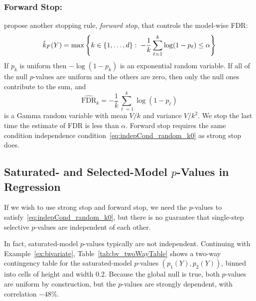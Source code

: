 \documentclass{article}
\begin{document}
\subsubsection{Forward Stop:}

\citet{gsell2013sequential} propose another stopping rule, {\em forward stop}, that controls the model-wise FDR:
\[
  \hat{k}_{F}(Y) = \max\left\{k \in \{1,\ldots,d\} :\;
    -\frac{1}{k}\sum_{\ell=1}^k \log(1-p_\ell) \leq \alpha\right\}
\]
If $p_k$ is uniform then  $-\log(1-p_k)$ is an exponential random variable. If all of the null $p$-values are uniform and the others are zero, then only the null ones contribute to the sum, and
\[
\widehat{\text{FDR}}_k = -\frac{1}{k}\sum_{\ell=1}^k \log(1-p_\ell)
\]
is a Gamma random variable with mean $V/k$ and variance $V/k^2$. We stop the last time the estimate of FDR is less than $\alpha$. Forward stop requires the same condition independence condition~\eqref{eq:indepCond_random_k0} as strong stop does.

\subsection{Saturated- and Selected-Model $p$-Values in Regression}

If we wish to use strong stop and forward stop, we need the $p$-values to satisfy~\eqref{eq:indepCond_random_k0}, but there is no guarantee that single-step selective $p$-values are independent of each other.

In fact, saturated-model $p$-values typically are not independent. Continuing with Example~\ref{ex:bivariate}, Table~\ref{tab:bv_twoWayTable} shows a two-way contingency table for the saturated-model $p$-values $(p_1(Y), p_2(Y))$, binned into cells of height and width 0.2. Because the global null is true, both $p$-values are uniform by construction, but the $p$-values are strongly dependent, with correlation $-48\%$.
\end{document}
